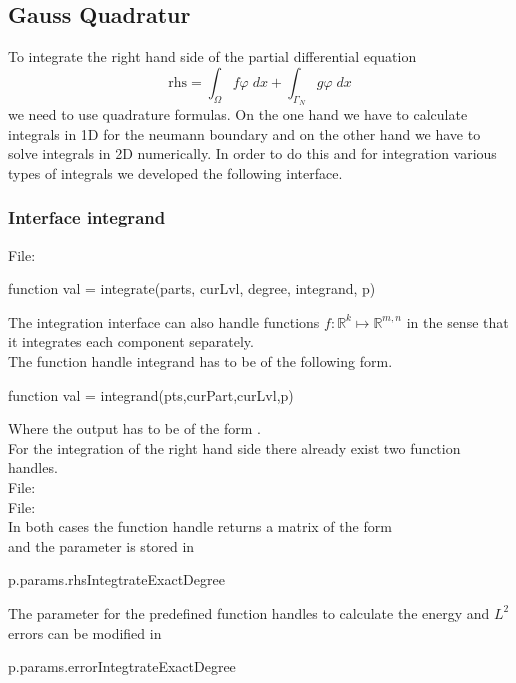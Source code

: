 \subsection{Gauss Quadratur}
To integrate the right hand side of the partial differential equation
\begin{equation*}
\textrm{rhs} = \int_{\Omega} f \varphi\; dx + \int_{\Gamma_N} g \varphi\; dx
\end{equation*}
we need to use quadrature formulas. On the one hand we have to
calculate integrals in 1D for the neumann boundary and on the other hand
we have to solve integrals in 2D numerically.
In order to do this and for integration various types of integrals
we developed the following interface.

\subsubsection{Interface integrand}$ $\\
File: 
\begin{pcode}
function val = integrate(parts, curLvl,  degree, integrand, p)
\end{pcode}

\noindent
The integration interface can also handle functions $f:\mathbb{R}^k \mapsto\mathbb{R}^{m,n}$ in the sense that it integrates each component separately.\\
The function handle integrand has to be of the following form.
\begin{pcode}
function val = integrand(pts,curPart,curLvl,p)
\end{pcode}
Where the output has to be of the form \code{[n m length(x)]}.\\
For the integration of the right hand side there already exist two function handles.\\[1.5ex]
File: \\
File: \\[1.5ex]
In both cases the function handle returns a matrix of the form\\ 
and the parameter  is stored in
\begin{pcode}
p.params.rhsIntegtrateExactDegree
\end{pcode}
The  parameter for the predefined function handles to calculate the energy and $L^2$ errors
can be modified in
\begin{pcode}
p.params.errorIntegtrateExactDegree
\end{pcode}
\bigskip

